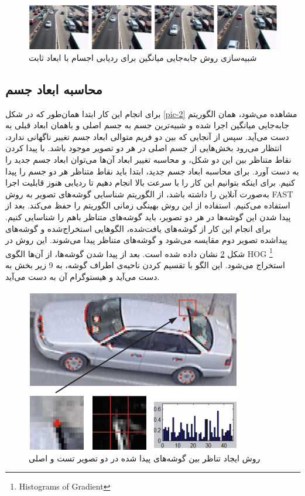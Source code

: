 \documentclass[paper=a4, fontsize=12pt]{article} %
\begin{document}
\begin{figure}[h]
\centering
\includegraphics[width=12cm]{fig5.png}
\caption{شبیه‌سازی روش جابه‌جایی میانگین برای ردیابی اجسام با ابعاد ثابت}
\label{pic-5}
\end{figure}



\subsection{	محاسبه ابعاد جسم}
برای انجام این کار ابتدا همان‌طور که در شکل \ref{pic-2} مشاهده می‌شود، همان الگوریتم جابه‌جایی میانگین اجرا شده و شبیه‌ترین جسم به جسم اصلی و باهمان ابعاد قبلی به دست می‌آید. سپس از آنجایی که بین دو فریم متوالی ابعاد جسم تغییر ناگهانی ندارد، انتظار می‌رود بخش‌هایی از جسم اصلی در هر دو تصویر موجود باشد. با پیدا کردن نقاط متناظر بین این دو شکل، و محاسبه تغییر ابعاد آن‌ها می‌توان ابعاد جسم جدید را به دست آورد.
برای محاسبه ابعاد جسم جدید، ابتدا باید نقاط متناظر هر دو جسم را پیدا کنیم. برای اینکه بتوانیم این کار را با سرعت بالا انجام دهیم تا ردیابی هنوز قابلیت اجرا به‌صورت آنلاین را داشته باشد، از الگوریتم شناسایی گوشه‌های تصویر به روش
 FAST
 \cite{6Collins} 
 استفاده می‌کنیم. استفاده از این روش بهینگی زمانی الگوریتم را حفظ می‌کند. بعد از پیدا شدن این گوشه‌ها در هر دو تصویر، باید گوشه‌های متناظر باهم را شناسایی کنیم. برای انجام این کار از گوشه‌های یافت‌شده، الگوهایی استخراج‌شده و گوشه‌های پیداشده تصویر دوم مقایسه می‌شود و گوشه‌های متناظر پیدا می‌شوند.
این روش در شکل \ref{pic-6} نشان داده شده است. بعد از پیدا شدن گوشه‌ها، از آن‌ها الگوی HOG \footnote{Histograms of Gradient} استخراج می‌شود. این الگو با تقسیم کردن ناحیه‌ی اطراف گوشه، به 9 زیر بخش به دست می‌آید و هیستوگرام آن به دست می‌آید.

\begin{figure}[h]
\centering
\includegraphics[scale=0.8]{fig6.png}
\caption{ روش ایجاد تناظر بین گوشه‌های پیدا شده در دو تصویر تست و اصلی}
\label{pic-6}
\end{figure}
\end{document}
